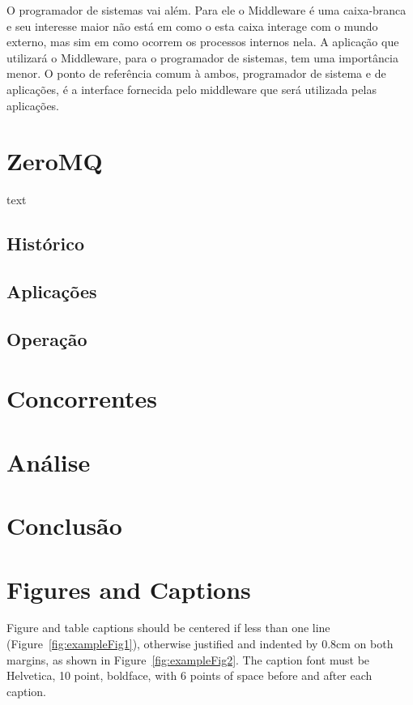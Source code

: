 \documentclass[12pt]{article}
\begin{document}
O programador de sistemas vai além. Para ele o Middleware é uma caixa-branca e seu
interesse maior não está em como o esta caixa interage com o mundo externo, mas sim em
como ocorrem os processos internos nela. A aplicação que utilizará o Middleware, para o
programador de sistemas, tem uma importância menor. O ponto de referência comum à ambos,
programador de sistema e de aplicações, é a interface fornecida pelo middleware que será
utilizada pelas aplicações.

\section{ZeroMQ} \label{sec:firstpage}

text

\subsection{Histórico}
\subsection{Aplicações}
\subsection{Operação}

\section{Concorrentes}

\section{Análise}
\section{Conclusão}

\section{Figures and Captions}\label{sec:figs}


Figure and table captions should be centered if less than one line
(Figure~\ref{fig:exampleFig1}), otherwise justified and indented by 0.8cm on
both margins, as shown in Figure~\ref{fig:exampleFig2}. The caption font must
be Helvetica, 10 point, boldface, with 6 points of space before and after each
caption.
\end{document}
